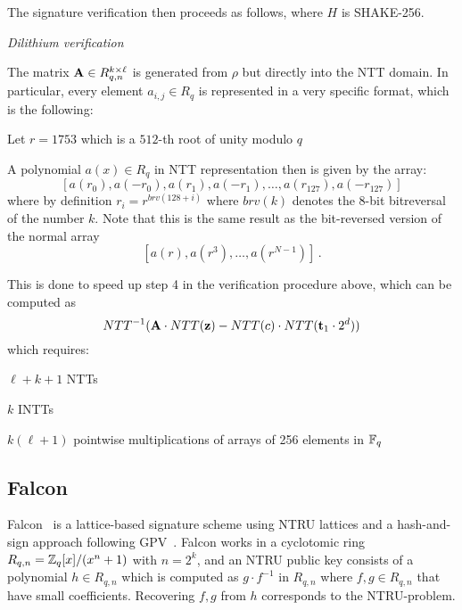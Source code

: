 The signature verification then proceeds as follows, where $H$ is SHAKE-256.
\begin{algorithm}[!ht] \label{algo:dilithium_verify}
\begin{scriptsize}
\caption{\emph{Dilithium verification}}
\end{scriptsize}
\end{algorithm} 

The matrix $\mathbf{A} \in R_{q,n}^{k \times \ell}$ is generated from $\rho$ but directly into the NTT domain.
In particular, every element $a_{i,j} \in R_q$ is represented in a very specific format, which is the following:
\bit
\item Let $r = 1753$ which is a $512$-th root of unity modulo $q$
\item A polynomial $a(x) \in R_q$ in NTT representation then is given by the array:
\[ [a(r_0), a(-r_0), a(r_1), a(-r_1), \ldots, a(r_{127}), a(-r_{127})] \]
\eit
where by definition $r_i = r^{brv(128 + i)}$ where $brv(k)$ denotes the 8-bit bitreversal of the number $k$.
Note that this is the same result as the bit-reversed version of the normal array
\[  [a(r), a(r^3), \ldots, a(r^{N-1})] \, .  \]


This is done to speed up step 4 in the verification procedure above, which can be computed as 
\[ NTT^{-1} (  \mathbf{A} \cdot NTT(\mathbf{z})  - NTT(c) \cdot NTT(\mathbf{t}_1 \cdot 2^d))  \]
which requires:
\bit
\item $\ell + k + 1$ NTTs
\item $k$ INTTs
\item $k (\ell + 1)$ pointwise multiplications of arrays of 256 elements in $\mathbb{F}_q$
\eit

\subsection{Falcon}

Falcon~\cite{falcon} is a lattice-based signature scheme using NTRU lattices and a hash-and-sign approach following GPV~\cite{}.
Falcon works in a cyclotomic ring $R_{q,n} =  \mathbb{Z}_q[x]/(x^n+1)$ with $n = 2^k$, and an NTRU public key consists 
of a polynomial $h \in R_{q,n}$ which is computed as $g \cdot f^{-1}$ in $R_{q,n}$ where $f,g \in R_{q,n}$ that have small coefficients.
Recovering $f, g$ from $h$ corresponds to the NTRU-problem.  

